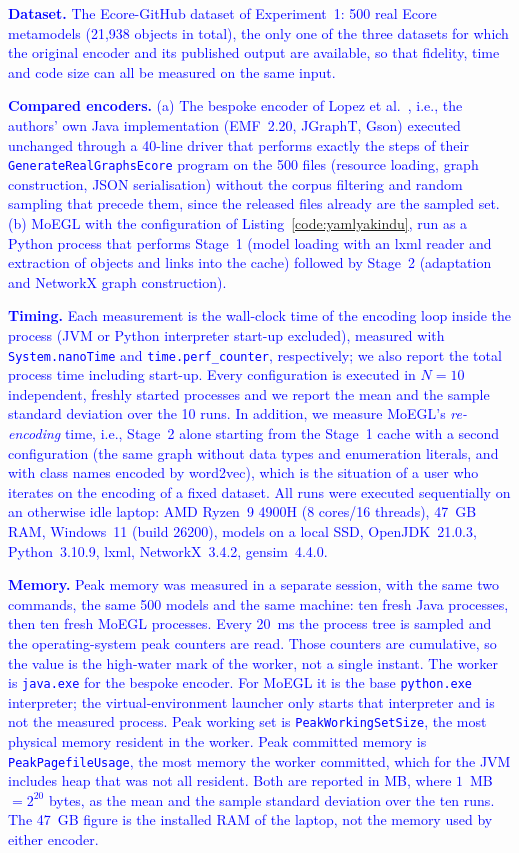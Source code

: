 \documentclass[journal,article,submit,moreauthors,technologies]{Definitions/mdpi}
\newcommand{\rev}[1]{\textcolor{blue}{#1}}
\begin{document}
\rev{\textbf{Dataset.} The Ecore-GitHub dataset of Experiment~1: 500 real Ecore metamodels (21{,}938 objects in total), the only one of the three datasets for which the original encoder and its published output are available, so that fidelity, time and code size can all be measured on the same input.}

\rev{\textbf{Compared encoders.} (a) The bespoke encoder of Lopez et al.~\cite{lopez2022generating}, i.e., the authors' own Java implementation (EMF~2.20, JGraphT, Gson) executed unchanged through a 40-line driver that performs exactly the steps of their \texttt{GenerateRealGraphsEcore} program on the 500 files (resource loading, graph construction, JSON serialisation) without the corpus filtering and random sampling that precede them, since the released files already are the sampled set. (b) MoEGL with the configuration of Listing~\ref{code:yamlyakindu}, run as a Python process that performs Stage~1 (model loading with an lxml reader and extraction of objects and links into the cache) followed by Stage~2 (adaptation and NetworkX graph construction).}

\rev{\textbf{Timing.} Each measurement is the wall-clock time of the encoding loop inside the process (JVM or Python interpreter start-up excluded), measured with \texttt{System.nanoTime} and \texttt{time.perf\_counter}, respectively; we also report the total process time including start-up. Every configuration is executed in $N=10$ independent, freshly started processes and we report the mean and the sample standard deviation over the 10 runs. In addition, we measure MoEGL's \emph{re-encoding} time, i.e., Stage~2 alone starting from the Stage~1 cache with a second configuration (the same graph without data types and enumeration literals, and with class names encoded by word2vec), which is the situation of a user who iterates on the encoding of a fixed dataset. All runs were executed sequentially on an otherwise idle laptop: AMD Ryzen~9 4900H (8 cores/16 threads), 47~GB RAM, Windows~11 (build 26200), models on a local SSD, OpenJDK~21.0.3, Python~3.10.9, lxml, NetworkX~3.4.2, gensim~4.4.0.}

\rev{\textbf{Memory.} Peak memory was measured in a separate session, with the same two commands, the same 500 models and the same machine: ten fresh Java processes, then ten fresh MoEGL processes. Every 20~ms the process tree is sampled and the operating-system peak counters are read. Those counters are cumulative, so the value is the high-water mark of the worker, not a single instant. The worker is \texttt{java.exe} for the bespoke encoder. For MoEGL it is the base \texttt{python.exe} interpreter; the virtual-environment launcher only starts that interpreter and is not the measured process. Peak working set is \texttt{PeakWorkingSetSize}, the most physical memory resident in the worker. Peak committed memory is \texttt{PeakPagefileUsage}, the most memory the worker committed, which for the JVM includes heap that was not all resident. Both are reported in MB, where $1$~MB $=2^{20}$ bytes, as the mean and the sample standard deviation over the ten runs. The 47~GB figure is the installed RAM of the laptop, not the memory used by either encoder.}
\end{document}
